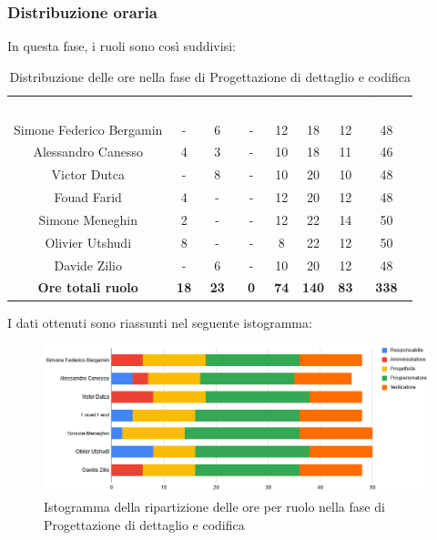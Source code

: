 \subsubsection{Distribuzione oraria}
In questa fase, i ruoli sono così suddivisi:
\begin{table}[H]
\centering\renewcommand{\arraystretch}{1.5}
\caption{Distribuzione delle ore nella fase di Progettazione di dettaglio e codifica}
\vspace{0.2cm}
\begin{tabular}{ c c c c c c c c }
\rowcolor{redafk}
\textcolor{white}{\textbf{Nominativo}} & \textcolor{white}{\textbf{Re}} &
\textcolor{white}{\textbf{Am}} & \textcolor{white}{\textbf{An}} &
\textcolor{white}{\textbf{Pt}} & \textcolor{white}{\textbf{Pm}} &
\textcolor{white}{\textbf{Ve}} & \textcolor{white}{\textbf{Totale}} \\
Simone Federico Bergamin & - & 6 & - & 12 & 18 & 12 & 48 \\
Alessandro Canesso & 4 & 3 & - & 10 & 18 & 11 & 46 \\
Victor Dutca & - & 8 & - & 10 & 20 & 10 & 48 \\
Fouad Farid & 4 & - & - & 12 & 20 & 12 & 48 \\
Simone Meneghin & 2 & - & - & 12 & 22 & 14 & 50 \\
Olivier Utshudi & 8 & - & - & 8 & 22 & 12 & 50 \\
Davide Zilio & - & 6 & - & 10 & 20 & 12 & 48 \\
\rowcolor{lastrowcolor}
\textbf{Ore totali ruolo} & \textbf{18} & \textbf{23} & \textbf{0} & \textbf{74} & \textbf{140} & \textbf{83} & \textbf{338} \\
\end{tabular}
\end{table}
 
I dati ottenuti sono riassunti nel seguente istogramma:
\begin{figure}[H]
\centering
\includegraphics[scale=0.60]{img/grafici/tabella_fase_prog_cod.png}
\caption{Istogramma della ripartizione delle ore per ruolo nella fase di Progettazione di dettaglio e codifica}
\end{figure}
 
